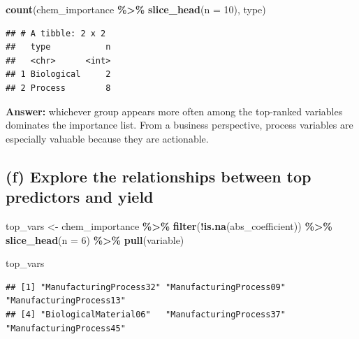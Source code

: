 \documentclass[
  11pt,
]{article}
\newenvironment{Shaded}{\begin{snugshade}}{\end{snugshade}}
\newcommand{\AttributeTok}[1]{\textcolor[rgb]{0.13,0.29,0.53}{#1}}
\newcommand{\DecValTok}[1]{\textcolor[rgb]{0.00,0.00,0.81}{#1}}
\newcommand{\FunctionTok}[1]{\textcolor[rgb]{0.13,0.29,0.53}{\textbf{#1}}}
\newcommand{\NormalTok}[1]{#1}
\newcommand{\OtherTok}[1]{\textcolor[rgb]{0.56,0.35,0.01}{#1}}
\newcommand{\SpecialCharTok}[1]{\textcolor[rgb]{0.81,0.36,0.00}{\textbf{#1}}}
\begin{document}
\begin{Shaded}
\begin{Highlighting}[]
\FunctionTok{count}\NormalTok{(chem\_importance }\SpecialCharTok{\%\textgreater{}\%} \FunctionTok{slice\_head}\NormalTok{(}\AttributeTok{n =} \DecValTok{10}\NormalTok{), type)}
\end{Highlighting}
\end{Shaded}

\begin{verbatim}
## # A tibble: 2 x 2
##   type           n
##   <chr>      <int>
## 1 Biological     2
## 2 Process        8
\end{verbatim}

\textbf{Answer:} whichever group appears more often among the top-ranked
variables dominates the importance list. From a business perspective,
process variables are especially valuable because they are actionable.

\subsection{(f) Explore the relationships between top predictors and
yield}\label{f-explore-the-relationships-between-top-predictors-and-yield}

\begin{Shaded}
\begin{Highlighting}[]
\NormalTok{top\_vars }\OtherTok{\textless{}{-}}\NormalTok{ chem\_importance }\SpecialCharTok{\%\textgreater{}\%}
  \FunctionTok{filter}\NormalTok{(}\SpecialCharTok{!}\FunctionTok{is.na}\NormalTok{(abs\_coefficient)) }\SpecialCharTok{\%\textgreater{}\%}
  \FunctionTok{slice\_head}\NormalTok{(}\AttributeTok{n =} \DecValTok{6}\NormalTok{) }\SpecialCharTok{\%\textgreater{}\%}
  \FunctionTok{pull}\NormalTok{(variable)}

\NormalTok{top\_vars}
\end{Highlighting}
\end{Shaded}

\begin{verbatim}
## [1] "ManufacturingProcess32" "ManufacturingProcess09" "ManufacturingProcess13"
## [4] "BiologicalMaterial06"   "ManufacturingProcess37" "ManufacturingProcess45"
\end{verbatim}
\end{document}
